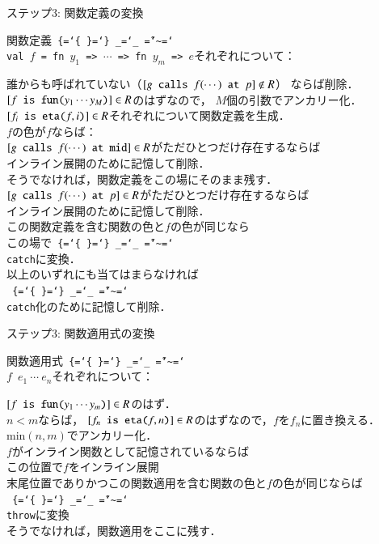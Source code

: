 \documentclass[aspectratio=169,t,dvipdfmx,12pt]{beamer}
\newcommand\codestyle{%
  \ttfamily
  \chardef\{=`\{
  \chardef\}=`\}
  \chardef\_=`\_
  \chardef\~=`\~
  \chardef\/=`\\
  \frenchspacing}
\newcommand\code[1]{\texttt{\protect\codestyle #1}}
\begin{document}
\begin{frame}{ステップ3: 関数定義の変換}

関数定義\code{val $f$ = fn $y_1$ => $\cdots$ => fn $y_m$ => $e$}それぞれについて：
\begin{tabbing}
\qquad
誰からも呼ばれていない（$[\code{$g$ calls $f(\cdots)$ at $p$}] \not\in R$）
ならば削除．\\
\qquad
$[\code{$f$ is fun($y_1\cdots y_M$)}] \in R$のはずなので，
$M$個の引数でアンカリー化．\\
\qquad
$[\code{$f_i$ is eta($f, i$)}] \in R$それぞれについて関数定義を生成．\\
\qquad
$f$の色が$f$ならば：\\
\qquad\qquad
$[\code{$g$ calls $f(\cdots)$ at mid}] \in R$がただひとつだけ存在するならば\\
\qquad\qquad\qquad
インライン展開のために記憶して削除．\\
\qquad\qquad
そうでなければ，関数定義をこの場にそのまま残す．\\
\qquad
$[\code{$g$ calls $f(\cdots)$ at $p$}] \in R$がただひとつだけ存在するならば\\
\qquad\qquad
インライン展開のために記憶して削除．\\
\qquad
この関数定義を含む関数の色と$f$の色が同じなら\\
\qquad\qquad
この場で\code{catch}に変換．\\
\qquad
以上のいずれにも当てはまらなければ\\
\qquad\qquad
\code{catch}化のために記憶して削除．
\end{tabbing}

\end{frame}

\begin{frame}{ステップ3: 関数適用式の変換}

関数適用式\code{$f$ $e_1\ \cdots\ e_n$}それぞれについて：
\begin{tabbing}
\qquad $[\code{$f$ is fun($y_1\cdots y_m$)}] \in R$のはず．\\
\qquad $n < m$ならば，
$[\code{$f_n$ is eta($f, n$)}] \in R$のはずなので，$f$を$f_n$に置き換える．\\
\qquad $\mathrm{min}(n, m)$でアンカリー化．\\
\qquad $f$がインライン関数として記憶されているならば\\
\qquad\qquad この位置で$f$をインライン展開\\
\qquad 末尾位置でありかつこの関数適用を含む関数の色と$f$の色が同じならば\\
\qquad\qquad \code{throw}に変換\\
\qquad そうでなければ，関数適用をここに残す．
\end{tabbing}

\end{frame}
\end{document}
